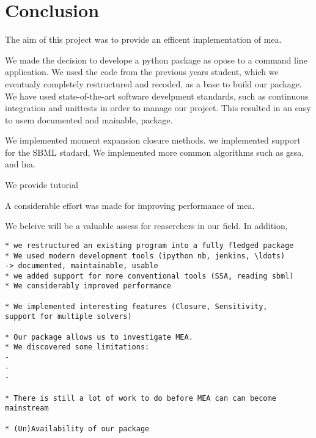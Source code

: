 \section{Conclusion} \label{sec:conclus}

The aim of this project was to provide an efficent \py{} implementation of \acrlong{mea}.

We made the decision to develope a python package as opose to a command line application.
We used the code from the previous years student, which we eventualy completely restructured and recoded, as a base to build our package.
We have used state-of-the-art software develpment standards, such as continuous integration and unittests in order to manage our project.
This resulted in an easy to usem documented and mainable, package.

We implemented moment expansion closure methods.
we implemented support for the SBML stadard,
We implemented more common algorithms such as \gls{gssa}, and \gls{lna}.

We provide tutorial

A considerable effort was made for improving performance of \gls{mea}.


We beleive \means{} will be a valuable assess for reaserchers in our field. In addition, 
 


\begin{verbatim}
* we restructured an existing program into a fully fledged package
* We used modern development tools (ipython nb, jenkins, \ldots)
-> documented, maintainable, usable
* we added support for more conventional tools (SSA, reading sbml)
* We considerably improved performance

* We implemented interesting features (Closure, Sensitivity,
support for multiple solvers)

* Our package allows us to investigate MEA.
* We discovered some limitations:
-
-
-

* There is still a lot of work to do before MEA can can become mainstream

* (Un)Availability of our package

\end{verbatim}

